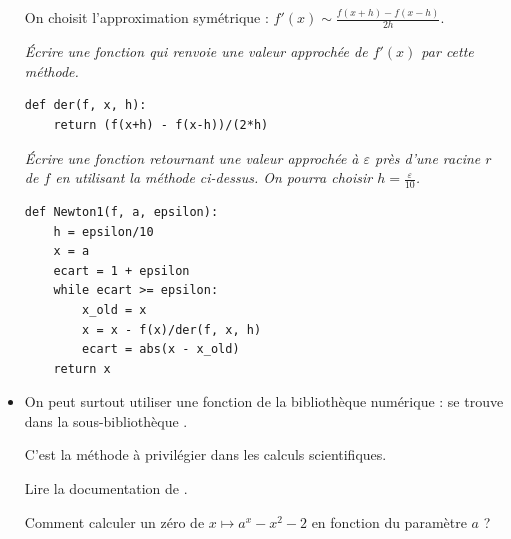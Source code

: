 \begin{itemize}
On choisit l'approximation symétrique  : $\displaystyle f'(x) \sim \frac{f(x+h) - f(x-h)}{2h}$.
\begin{Exercise}\it
Écrire une fonction   qui renvoie une valeur approchée de $f'(x)$ par cette méthode.
\end{Exercise}
\begin{Answer}
\begin{lstlisting}
def der(f, x, h):
    return (f(x+h) - f(x-h))/(2*h)
\end{lstlisting}
\end{Answer}
\begin{Exercise}[title = Méthode de la pseudo-dérivée]\it
Écrire une fonction   retournant une valeur approchée à $\varepsilon$ près d'une racine $r$ de $f$ en utilisant la méthode ci-dessus. On pourra choisir $h = \frac{\varepsilon}{10}$.
\end{Exercise}
\begin{Answer}
\begin{lstlisting}
def Newton1(f, a, epsilon):
    h = epsilon/10
    x = a
    ecart = 1 + epsilon
    while ecart >= epsilon:
        x_old = x
        x = x - f(x)/der(f, x, h)
        ecart = abs(x - x_old)
    return x
\end{lstlisting}
\end{Answer}
\item On peut surtout utiliser une fonction de la  bibliothèque numérique :  se trouve dans la sous-bibliothèque .

C'est la méthode à privilégier dans les calculs scientifiques.
\begin{Exercise}Lire la documentation de .

Comment calculer un zéro de $x \mapsto a^x - x^2-2$ en fonction du paramètre $a$ ?


\end{Exercise}
\end{itemize}

